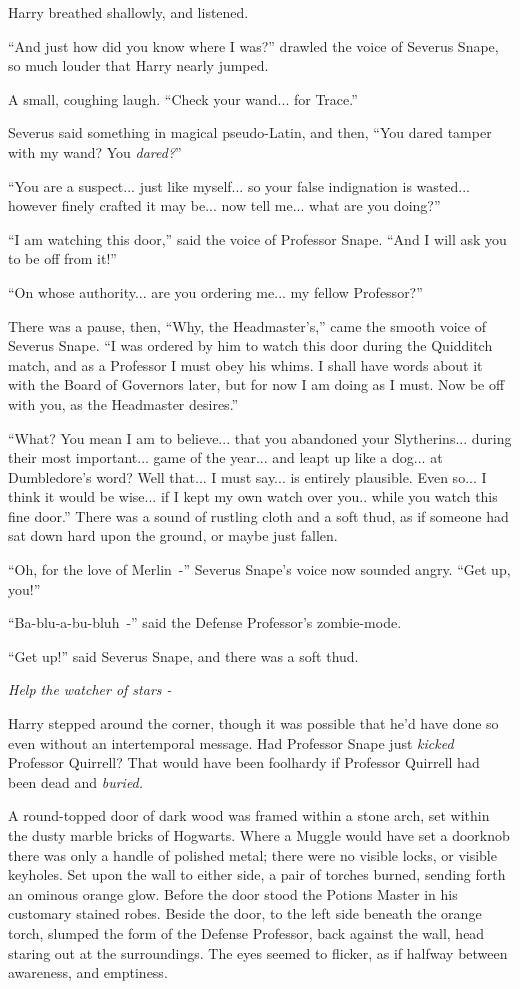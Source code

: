 Harry breathed shallowly, and listened.

``And just how did you know where I was?'' drawled the voice of Severus Snape, so much louder that Harry nearly jumped.

A small, coughing laugh. ``Check your wand... for Trace.''

Severus said something in magical pseudo-Latin, and then, ``You dared tamper with my wand? You \emph{dared?}''

``You are a suspect... just like myself... so your false indignation is wasted... however finely crafted it may be... now tell me... what are you doing?''

``I am watching this door,'' said the voice of Professor Snape. ``And I will ask you to be off from it!''

``On whose authority... are you ordering me... my fellow Professor?''

There was a pause, then, ``Why, the Headmaster's,'' came the smooth voice of Severus Snape. ``I was ordered by him to watch this door during the Quidditch match, and as a Professor I must obey his whims. I shall have words about it with the Board of Governors later, but for now I am doing as I must. Now be off with you, as the Headmaster desires.''

``What? You mean I am to believe... that you abandoned your Slytherins... during their most important... game of the year... and leapt up like a dog... at Dumbledore's word? Well that... I must say... is entirely plausible. Even so... I think it would be wise... if I kept my own watch over you.. while you watch this fine door.'' There was a sound of rustling cloth and a soft thud, as if someone had sat down hard upon the ground, or maybe just fallen.

``Oh, for the love of Merlin~-'' Severus Snape's voice now sounded angry. ``Get up, you!''

``Ba-blu-a-bu-bluh~-'' said the Defense Professor's zombie-mode.

``Get up!'' said Severus Snape, and there was a soft thud.

\emph{Help the watcher of stars -}

Harry stepped around the corner, though it was possible that he'd have done so even without an intertemporal message. Had Professor Snape just \emph{kicked} Professor Quirrell? That would have been foolhardy if Professor Quirrell had been dead and \emph{buried.}

A round-topped door of dark wood was framed within a stone arch, set within the dusty marble bricks of Hogwarts. Where a Muggle would have set a doorknob there was only a handle of polished metal; there were no visible locks, or visible keyholes. Set upon the wall to either side, a pair of torches burned, sending forth an ominous orange glow. Before the door stood the Potions Master in his customary stained robes. Beside the door, to the left side beneath the orange torch, slumped the form of the Defense Professor, back against the wall, head staring out at the surroundings. The eyes seemed to flicker, as if halfway between awareness, and emptiness.

